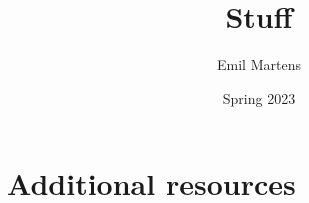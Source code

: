 \documentclass[british,titlepage,oneside]{ntnuthesis}
\title{Stuff}
\author{Emil Martens}
\date{Spring 2023}
\begin{document}
\tableofcontents
\pagebreak

% 
% 
% 
% 
% 
% 

\chapter*{\bibname}

\AtNextBibliography{\footnotesize}
\printbibliography

\chapter{Additional resources}




%  
\end{document}
